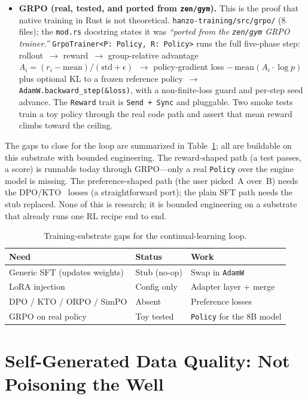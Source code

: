 \documentclass[11pt]{article}
\begin{document}
\begin{itemize}
    \item \textbf{GRPO (real, tested, and ported from \texttt{zen/gym}).} This is the proof that native training in Rust is not theoretical. \texttt{hanzo-training/src/grpo/} (8 files); the \texttt{mod.rs} docstring states it was \emph{``ported from the \texttt{zen/gym} GRPO~\cite{grpo} trainer.''} \texttt{GrpoTrainer<P: Policy, R: Policy>} runs the full five-phase step: rollout~$\to$ reward~$\to$ group-relative advantage $A_i = (r_i - \mathrm{mean})/(\mathrm{std}+\epsilon)$~$\to$ policy-gradient loss $-\,\mathrm{mean}(A_i \cdot \log p)$ plus optional KL to a frozen reference policy~$\to$ \texttt{AdamW.backward\_step(\&loss)}, with a non-finite-loss guard and per-step seed advance. The \texttt{Reward} trait is \texttt{Send + Sync} and pluggable. Two smoke tests train a toy policy through the real code path and assert that mean reward climbs toward the ceiling.
\end{itemize}

The gaps to close for the loop are summarized in Table~\ref{tab:substrate}; all are buildable on this substrate with bounded engineering. The reward-shaped path (a test passes, a score) is runnable today through GRPO---only a real \texttt{Policy} over the engine model is missing. The preference-shaped path (the user picked~A over~B) needs the DPO/KTO~\cite{dpo} losses (a straightforward port); the plain SFT path needs the stub replaced. None of this is research; it is bounded engineering on a substrate that already runs one RL recipe end to end.

\begin{table}[t]
\centering
\caption{Training-substrate gaps for the continual-learning loop.}
\label{tab:substrate}
\small
\begin{tabular}{@{}lll@{}}
\toprule
\textbf{Need} & \textbf{Status} & \textbf{Work} \\
\midrule
Generic SFT (updates weights) & Stub (no-op) & Swap in \texttt{AdamW} \\
LoRA injection & Config only & Adapter layer + merge \\
DPO / KTO / ORPO / SimPO & Absent & Preference losses \\
GRPO on real policy & Toy tested & \texttt{Policy} for the 8B model \\
\bottomrule
\end{tabular}
\end{table}

\section{Self-Generated Data Quality: Not Poisoning the Well}
\label{sec:collapse}
\end{document}

